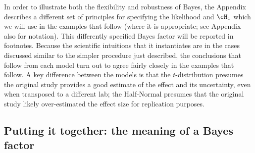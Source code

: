 In order to illustrate both the flexibility and robustness of Bayes, the Appendix describes a different set of principles for specifying the likelihood and $\cH_1$ which we will use in the examples that follow (where it is appropriate; see Appendix also for notation). This differently specified Bayes factor will be reported in footnotes. Because the scientific intuitions that it instantiates are in the cases discussed similar to the simpler procedure just described, the conclusions that follow from each model turn out to agree fairly closely in the examples that follow. A key difference between the models is that the $t$-distribution presumes the original study provides a good estimate of the effect and its uncertainty, even when transposed to a different lab; the Half-Normal presumes that the original study likely over-estimated the effect size for replication purposes.

\subsection{Putting it together: the meaning of a Bayes factor}

